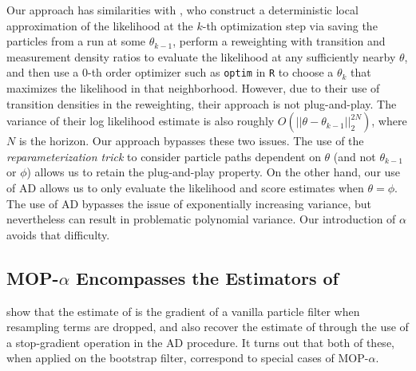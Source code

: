 \documentclass[9pt,twocolumn,pnasresearcharticle]{pnas-new}
\begin{document}
Our approach has similarities with \cite{svensson18}, who construct a deterministic local approximation of the likelihood at the $k$-th optimization step via saving the particles from a run at some $\theta_{k-1}$, perform a reweighting with transition and measurement density ratios to evaluate the likelihood at any sufficiently nearby $\theta$, and then use a $0$-th order optimizer such as \texttt{optim} in \texttt{R} to choose a $\theta_k$ that maximizes the likelihood in that neighborhood. 
However, due to their use of transition densities in the reweighting, their approach is not plug-and-play. The variance of their log likelihood estimate is also roughly $O(||\theta - \theta_{k-1}||_2^{2N})$, where $N$ is the horizon. Our approach bypasses these two issues. The use of the \textit{reparameterization trick} to consider particle paths dependent on $\theta$ (and not $\theta_{k-1}$ or $\phi$) allows us to retain the plug-and-play property. On the other hand, our use of AD allows us to only evaluate the likelihood and score estimates when $\theta=\phi$. 
The use of AD bypasses the issue of exponentially increasing variance, but nevertheless can result in problematic polynomial variance.
Our introduction of $\alpha$ avoids that difficulty.

\subsection{MOP-$\alpha$ Encompasses the Estimators of \cite{poyiadjis11, scibior21, naesseth18}}

\cite{scibior21} show that the estimate of \cite{naesseth18} is the gradient of a vanilla particle filter when resampling terms are dropped, and also recover the estimate of \cite{poyiadjis11} through the use of a stop-gradient operation in the AD procedure. It turns out that both of these, when applied on the bootstrap filter, correspond to special cases of MOP-$\alpha$.
\end{document}
